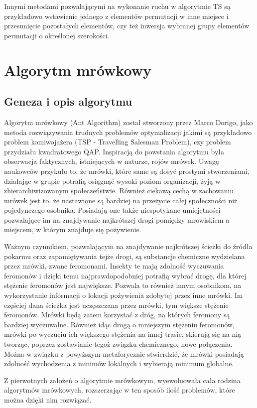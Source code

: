 Innymi metodami pozwalającymi na wykonanie ruchu w algorytmie TS są przykładowo wstawienie jednego z elementów permutacji w inne miejsce i przesunięcie pozostałych elementów, czy też inwersja wybranej grupy elementów permutacji o określonej szerokości.

\section{Algorytm mrówkowy}
\label{sec:mrowka}
\subsection{Geneza i opis algorytmu}
Algorytm mrówkowy (Ant Algorithm) został stworzony przez Marco Dorigo, jako metoda rozwiązywania trudnych problemów optymalizacji jakimi są przykładowo problem komiwojażera (TSP - Travelling Salesman Problem), czy problem przydziału kwadratowego QAP. Inspiracją do powstania algorytmu była obserwacja faktycznych, istniejących w naturze, rojów mrówek. Uwagę naukowców przykuło to, że mrówki, które same są dosyć prostymi stworzeniami, działając w grupie potrafią osiągnąć wysoki poziom organizacji, żyją w zhierarchiwizowanym społeczeństwie. Również ciekawą cechą w zachowaniu mrówek jest to, że nastawione są bardziej na przeżycie całej społeczności niż pojedynczego osobnika. Posiadają one także niespotykane umiejętności pozwalające im na znajdywanie najkrótszej drogi pomiędzy mrowiskiem a miejscem, w którym znajduje się pożywienie.

Ważnym czynnikiem, pozwalającym na znajdywanie najkrótszej ścieżki do źródła pokarmu oraz zapamiętywania tejże drogi, są substancje chemiczne wydzielana przez mrówki, zwane feromonami. Insekty te mają zdolność wyczuwania feromonów i dzięki temu najprawdopodobniej potrafią wybrać drogę, dla której stężenie feromonów jest największe. Pozwala to również innym osobnikom, na wykorzystanie informacji o lokacji pożywienia zdobytej przez inne mrówki. Im częściej dana ścieżka jest uczęszczana przez mrówki, tym większe stężenie feromonów. Mrówki będą zatem korzystać z dróg, na których feromony są bardziej wyczuwalne. Również idąc drogą o mniejszym stężeniu feromonów, mrówki po wyczuciu ich większego stężenia na innej trasie, skierują się na nią tworząc, poprzez zostawianie tegoż związku chemicznego, nowe połączenia. Można w związku z powyższym metaforycznie stwierdzić, że mrówki posiadają zdolność wychodzenia z minimów lokalnych i wybierają minimum globalne.

Z pierwotnych założeń o algorytmie mrówkowym, wyewoluowała cała rodzina algorytmów mrówkowych, rozszerzając w ten sposób ilość problemów, które można dzięki nim rozwiązać. 

